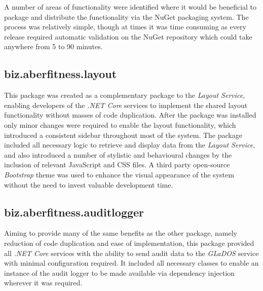 A number of areas of functionality were identified where it would be beneficial to package and distribute the functionality via the NuGet packaging system. The process was relatively simple, though at times it was time consuming as every release required automatic validation on the NuGet repository which could take anywhere from 5 to 90 minutes.

\subsection{biz.aberfitness.layout}
This package was created as a complementary package to the \textit{Layout Service}, enabling developers of the \textit{.NET Core} services to implement the shared layout functionality without masses of code duplication. After the package was installed only minor changes were required to enable the layout functionality, which introduced a consistent sidebar throughout most of the system. The package included all necessary logic to retrieve and display data from the \textit{Layout Service}, and also introduced a number of stylistic and behavioural changes by the inclusion of relevant JavaScript and CSS files. A third party open-source \textit{Bootstrap} theme\cite{elaadmin} was used to enhance the visual appearance of the system without the need to invest valuable development time.

\subsection{biz.aberfitness.auditlogger}
Aiming to provide many of the same benefits as the other package, namely reduction of code duplication and ease of implementation, this package provided all \textit{.NET Core} services with the ability to send audit data to the \textit{GLaDOS} service with minimal configuration required. It included all necessary classes to enable an instance of the audit logger to be made available via dependency injection wherever it was required.
